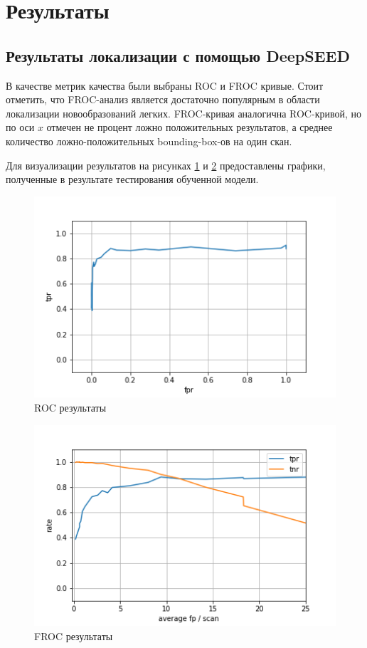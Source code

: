 \section{Результаты}

\subsection{Результаты локализации с помощью DeepSEED}

В качестве метрик качества были выбраны ROC и FROC кривые. Стоит отметить, что FROC-анализ является достаточно популярным в области локализации новообразований легких. FROC-кривая аналогична ROC-кривой, но по оси $x$ отмечен не процент ложно положительных результатов, а среднее количество ложно-положительных bounding-box-ов на один скан.

Для визуализации результатов на рисунках \ref{roc-baseline} и \ref{froc-baseline} предоставлены графики, полученные в результате тестирования обученной модели.

\begin{figure}[!h]
\includegraphics[width=\linewidth]{roc.png}
\caption{ROC результаты}\label{roc-baseline}
\centering
\end{figure}

\begin{figure}[!h]
\includegraphics[width=\linewidth]{froc.png}
\caption{FROC результаты}\label{froc-baseline}
\centering
\end{figure}

